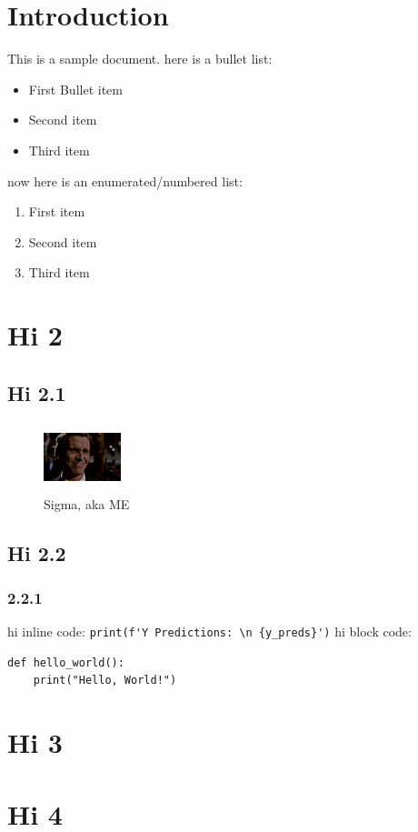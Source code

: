 \documentclass{book}
\begin{document}
\section{Introduction}

This is a sample document.\newline
here is a bullet list:
\begin{itemize}
    \item First Bullet item
    \item Second item
    \item Third item
\end{itemize}
now here is an enumerated/numbered list:
\begin{enumerate}
    \item First item
    \item Second item
    \item Third item
\end{enumerate}

\section{Hi 2}
\subsection{Hi 2.1}
\begin{figure}[ht]
    \centering
    \includegraphics[width=0.2\textwidth, height=2cm]{temp.jpeg}
    \caption{Sigma, aka ME}
    \label{fig:sample}
\end{figure}
\subsection{Hi 2.2}
\subsubsection{2.2.1}
hi inline code: \lstinline|print(f'Y Predictions: \n {y_preds}')|
\newline
hi block code:
\begin{lstlisting}
def hello_world():
    print("Hello, World!")
\end{lstlisting}

\section{Hi 3}

\section{Hi 4}
\end{document}
